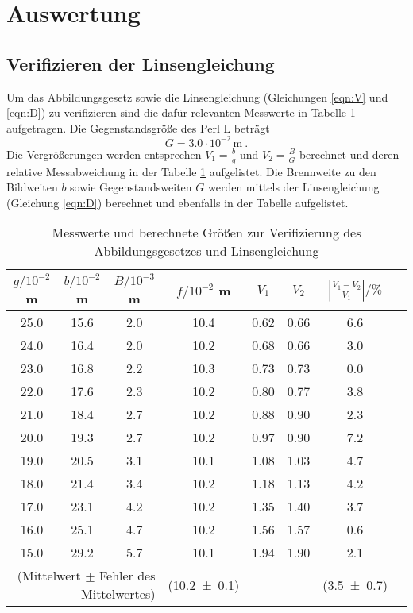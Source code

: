 \section{Auswertung}
\label{sec:Auswertung}
\subsection{Verifizieren der Linsengleichung}
Um das Abbildungsgesetz sowie die Linsengleichung (Gleichungen \eqref{eqn:V} und \eqref{eqn:D}) zu verifizieren sind die dafür relevanten Messwerte in Tabelle \ref{tab:VdA} aufgetragen. Die Gegenstandsgröße des Perl L beträgt
\begin{equation}
  G = 3.0 \cdot 10^{-2} \, \text{m} \ .
\end{equation}
Die Vergrößerungen werden entsprechen $V_1 = \frac{b}{g}$ und $V_2 = \frac{B}{G}$ berechnet und deren relative Messabweichung in der Tabelle \ref{tab:VdA} aufgelistet. Die Brennweite zu den Bildweiten $b$ sowie Gegenstandsweiten $G$ werden mittels der Linsengleichung (Gleichung \eqref{eqn:D}) berechnet und ebenfalls in der Tabelle aufgelistet.
\begin{table}
  \centering
  \begin{tabular}{c c c | c | c c c c}
    \toprule
    $g / 10^{-2}$ m & $b / 10^{-2}$ m & $B / 10^{-3}$ m & $f / 10^{-2}$ m & $V_1$ & $V_2$ & $\left\lvert \frac{V_1 - V_2}{V_1} \right\rvert / \% $\\
   \midrule
    25.0 & 15.6 & 2.0 & 10.4 & 0.62   & 0.66	& 6.6 \\
    24.0 & 16.4 & 2.0 & 10.2 & 0.68   & 0.66	& 3.0	\\
    23.0 & 16.8 & 2.2 & 10.3 & 0.73   & 0.73	& 0.0	\\
    22.0 & 17.6 & 2.3 & 10.2 & 0.80   & 0.77	& 3.8	\\
    21.0 & 18.4 & 2.7 & 10.2 & 0.88   & 0.90	& 2.3	\\
    20.0 & 19.3 & 2.7 & 10.2 & 0.97   & 0.90	& 7.2	\\
    19.0 & 20.5 & 3.1 & 10.1 & 1.08   & 1.03	& 4.7	\\
    18.0 & 21.4 & 3.4 & 10.2 & 1.18   & 1.13	& 4.2	\\
    17.0 & 23.1 & 4.2 & 10.2 & 1.35   & 1.40	& 3.7	\\
    16.0 & 25.1 & 4.7 & 10.2 & 1.56   & 1.57	& 0.6	\\
    15.0 & 29.2 & 5.7 & 10.1 & 1.94   & 1.90	& 2.1	\\
    \midrule
    \multicolumn{3}{r|}{(Mittelwert $\pm$ Fehler des Mittelwertes)}&(\num {10.2 +- 0.1}) & & & (\num{3.5 +- 0.7})\\
    \bottomrule
  \end{tabular}
  \caption{Messwerte und berechnete Größen zur Verifizierung des Abbildungsgesetzes und Linsengleichung}
  \label{tab:VdA}
\end{table}
